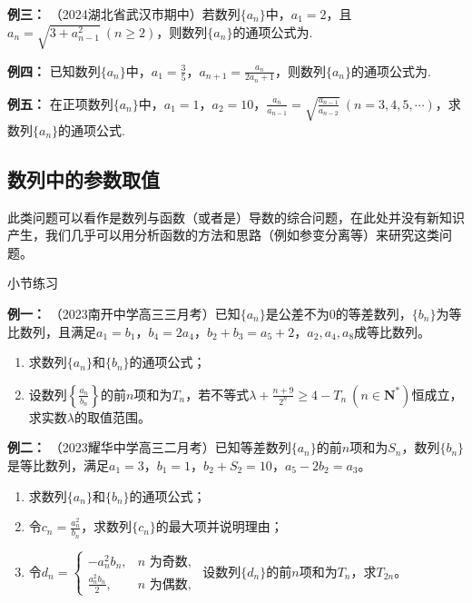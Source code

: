 \documentclass{article}
\begin{document}
\noindent \textbf{例三： }（2024湖北省武汉市期中）若数列$\{a_n\}$中，$a_1=2$，且$a_n=\sqrt{3+a_{n-1}^2}\ (n\geqslant 2)$，则数列$\{a_n\}$的通项公式为\underline{\quad\quad\quad\quad\quad\quad}.
\vspace{1\baselineskip}

\noindent \textbf{例四： } 已知数列$\{a_n\}$中，$a_1 = \frac{3}{5}$，$a_{n+1} = \frac{a_n}{2a_n + 1}$，则数列$\{a_n\}$的通项公式为\underline{\quad\quad\quad\quad\quad\quad}.
\vspace{1\baselineskip}

\noindent \textbf{例五： } 在正项数列$\{a_n\}$中，$a_1 = 1$，$a_2 = 10$，$\frac{a_n}{a_{n-1}} = \sqrt{\frac{a_{n-1}}{a_{n-2}}}\ (n = 3,4,5,\cdots)$，求数列$\{a_n\}$的通项公式.
\vspace{2\baselineskip}

\subsection{数列中的参数取值}

此类问题可以看作是数列与函数（或者是）导数的综合问题，在此处并没有新知识产生，我们几乎可以用分析函数的方法和思路（例如参变分离等）来研究这类问题。

\begin{center}
    小节练习
\end{center}

\noindent \textbf{例一： }（2023南开中学高三三月考）已知$\{a_n\}$是公差不为$0$的等差数列，$\{b_n\}$为等比数列，且满足$a_1 = b_1$，$b_4 = 2a_4$，$b_2 + b_3 = a_5 + 2$，$a_2, a_4, a_8$成等比数列。

\begin{enumerate}[label=(\Roman*)]  %
    \item 求数列$\{a_n\}$和$\{b_n\}$的通项公式；
    
    \item 设数列$\left\{\frac{a_n}{b_n}\right\}$的前$n$项和为$T_n$，若不等式$\lambda + \frac{n+9}{2^n} \ge 4 - T_n\ (n \in \mathbf{N}^*)$恒成立，求实数$\lambda$的取值范围。
\end{enumerate}
\newpage

\noindent \textbf{例二： }（2023耀华中学高三二月考）已知等差数列$\{a_n\}$的前$n$项和为$S_n$，数列$\{b_n\}$是等比数列，满足$a_1=3$，$b_1=1$，$b_2+S_2=10$，$a_5-2b_2=a_3$。

\begin{enumerate}[label=(\Roman*)]
    \item 求数列$\{a_n\}$和$\{b_n\}$的通项公式；
    
    \item 令$c_n=\frac{a_n^2}{b_n}$，求数列$\{c_n\}$的最大项并说明理由；
    
    \item 令$d_n=\begin{cases}
    -a_n^2b_n, & n\text{ 为奇数}, \\
    \frac{a_n^2b_n}{2}, & n\text{ 为偶数},
    \end{cases}$ 设数列$\{d_n\}$的前$n$项和为$T_n$，求$T_{2n}$。
\end{enumerate}
\vspace{18\baselineskip}
\end{document}
